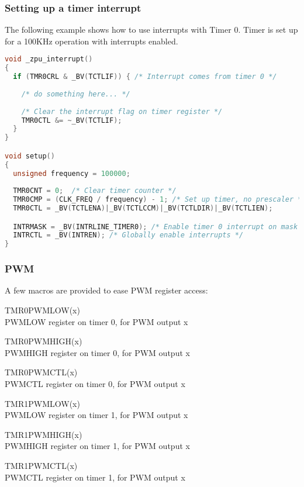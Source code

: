 \subsubsection{Setting up a timer interrupt}

The following example shows how to use interrupts with Timer 0. 
Timer is set up for a 100KHz operation with interrupts enabled.
\begin{lstlisting}[language=C++]
void _zpu_interrupt()
{
  if (TMR0CRL & _BV(TCTLIF)) { /* Interrupt comes from timer 0 */
                
    /* do something here... */
                
    /* Clear the interrupt flag on timer register */
    TMR0CTL &= ~_BV(TCTLIF);
  }
}

void setup()
{
  unsigned frequency = 100000;
        
  TMR0CNT = 0;  /* Clear timer counter */
  TMR0CMP = (CLK_FREQ / frequency) - 1; /* Set up timer, no prescaler */
  TMR0CTL = _BV(TCTLENA)|_BV(TCTLCCM)|_BV(TCTLDIR)|_BV(TCTLIEN);

  INTRMASK = _BV(INTRLINE_TIMER0); /* Enable timer 0 interrupt on mask */
  INTRCTL = _BV(INTREN); /* Globally enable interrupts */
}
\end{lstlisting}




\subsubsection{PWM}
A few macros are provided to ease PWM register access: \\

\begin{description}
\item{TMR0PWMLOW(x)} \hfill \\ PWMLOW register on timer 0, for PWM output x
\item{TMR0PWMHIGH(x)}\hfill \\ PWMHIGH register on timer 0, for PWM output x
\item{TMR0PWMCTL(x)} \hfill \\ PWMCTL register on timer 0, for PWM output x

\item{TMR1PWMLOW(x)} \hfill \\ PWMLOW register on timer 1, for PWM output x
\item{TMR1PWMHIGH(x)}\hfill \\ PWMHIGH register on timer 1, for PWM output x
\item{TMR1PWMCTL(x)} \hfill \\ PWMCTL register on timer 1, for PWM output x

\end{description}
